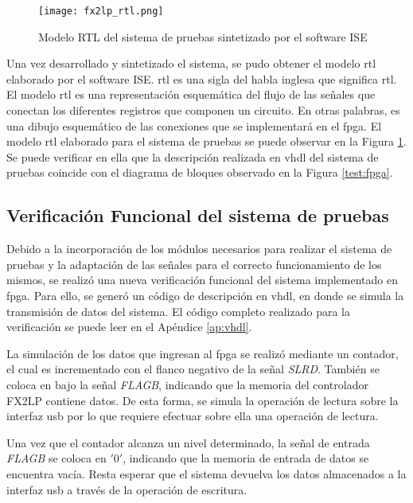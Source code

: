 		\begin{figure}[b]
			\centering
			\texttt{[image: fx2lp\_rtl.png]}
			\caption{Modelo RTL del sistema de pruebas sintetizado por el software ISE}
			\label{test:rtl}
		\end{figure}
	
		Una vez desarrollado y sintetizado el sistema, se pudo obtener el modelo \acrshort{rtl} elaborado por el software ISE. \acrshort{rtl} es una sigla del habla inglesa que significa \acrlong{rtl}. El modelo \acrshort{rtl} es una representación esquemática del flujo de las señales que conectan los diferentes registros que componen un circuito. En otras palabras, es una dibujo esquemático de las conexiones que se implementará en el \acrshort{fpga}. El modelo \acrshort{rtl} elaborado para el sistema de pruebas se puede observar en la Figura \ref{test:rtl}. Se puede verificar en ella que la descripción realizada en \acrshort{vhdl} del sistema de pruebas coincide con el diagrama de bloques observado en la Figura \ref{test:fpga}.
		
\subsection{Verificación Funcional del sistema de pruebas}
	Debido a la incorporación de los módulos necesarios para realizar el sistema de pruebas y la adaptación de las señales para el correcto funcionamiento de los mismos, se realizó una nueva verificación funcional del sistema implementado en \acrshort{fpga}. Para ello, se generó un código de descripción en \acrshort{vhdl}, en donde se simula la transmisión de datos del sistema. El código completo realizado para la verificación se puede leer en el Apéndice \ref{ap:vhdl}.
	
	La simulación de los datos que ingresan al \acrshort{fpga} se realizó mediante un contador, el cual es incrementado con el flanco negativo de la señal \textit{SLRD}. También se coloca en bajo la señal \textit{FLAGB}, indicando que la memoria del controlador FX2LP contiene datos. De esta forma, se simula la operación de lectura sobre la interfaz \acrshort{usb} por lo que requiere efectuar sobre ella una operación de lectura.
	
	Una vez que el contador alcanza un nivel determinado, la señal de entrada \textit{FLAGB} se coloca en $'0'$, indicando que la memoria de entrada de datos se encuentra vacía. Resta esperar que el sistema devuelva los datos almacenados a la interfaz \acrshort{usb} a través de la operación de escritura.
	
